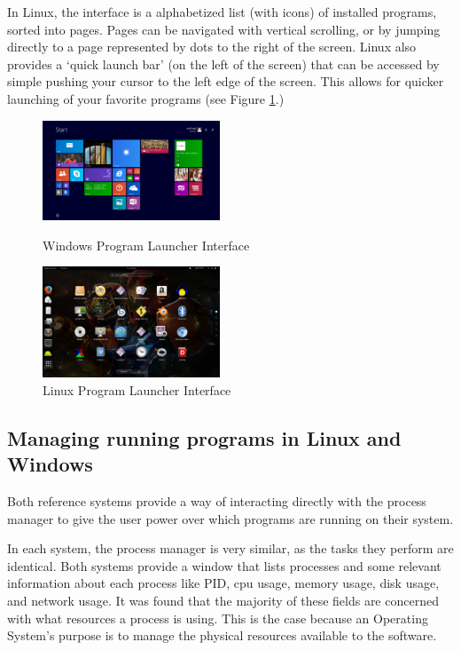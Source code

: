 \documentclass[a4paper]{report}
\begin{document}
In Linux, the interface is a alphabetized list (with icons) of installed programs, sorted into pages. Pages can be navigated with vertical scrolling, or by jumping directly to a page represented by dots to the right of the screen. Linux also provides a `quick launch bar' (on the left of the screen) that can be accessed by simple pushing your cursor to the left edge of the screen. This allows for quicker launching of your favorite programs (see Figure \ref{fig:LinLaunchScreen}.)


\begin{figure}[ht]
\centering
\begin{minipage}{.5\textwidth}
  \centering
  \includegraphics[width=200px]{images/Windows_Program_Launcher_Screenshot}
  \caption{Windows Program Launcher Interface}
  \label{fig:WinLaunchScreen}
\end{minipage}%
\begin{minipage}{.5\textwidth}
  \centering
  \includegraphics[width=200px]{images/Linux_Program_Launcher_Screenshot}
  \caption{Linux Program Launcher Interface}
  \label{fig:LinLaunchScreen}
\end{minipage}
\end{figure}


\subsection{Managing running programs in Linux and Windows}

Both reference systems provide a way of interacting directly with the process manager to give the user power over which programs are running on their system.

In each system, the process manager is very similar, as the tasks they perform are identical. Both systems provide a window that lists processes and some relevant information about each process like PID, cpu usage, memory usage, disk usage, and network usage. It was found that the majority of these fields are concerned with what resources a process is using. This is the case because an Operating System's purpose is to manage the physical resources available to the software.
\end{document}
